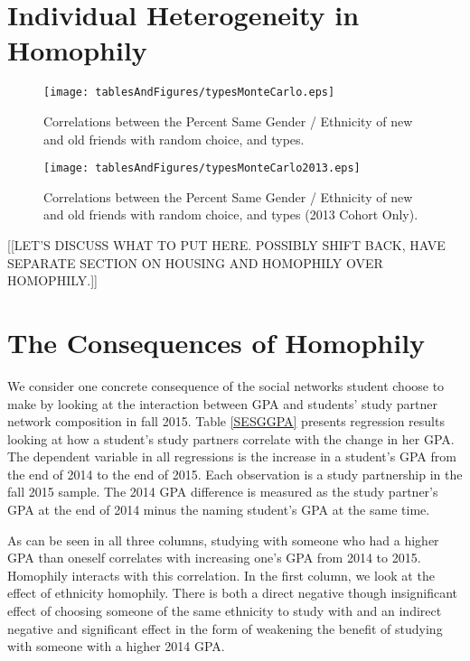 \documentclass[12pt,letterpaper,english]{article}
\begin{document}
\section{Individual Heterogeneity in Homophily \label{sec:heteroInHomophily} }

\begin{figure}[t!]
\begin{center}
\caption{Correlations between the Percent Same Gender / Ethnicity of new and old friends with random choice, and types.}
\texttt{[image: tablesAndFigures/typesMonteCarlo.eps]}
\end{center}
\end{figure}

\begin{figure}[t!]
\begin{center}
\caption{Correlations between the Percent Same Gender / Ethnicity of new and old friends with random choice, and types (2013 Cohort Only).}
\texttt{[image: tablesAndFigures/typesMonteCarlo2013.eps]}
\end{center}
\end{figure}

[[LET'S DISCUSS WHAT TO PUT HERE. POSSIBLY SHIFT BACK, HAVE SEPARATE SECTION ON HOUSING AND HOMOPHILY OVER HOMOPHILY.]]

\section{The Consequences of Homophily}
\label{sec:GPA}

We consider one concrete consequence of the social networks student choose to make by looking at the interaction between GPA and students' study partner network composition in fall 2015. Table \ref{SESGGPA} presents regression results looking at how a student's study partners correlate with the change in her GPA. The dependent variable in all regressions is the increase in a student's GPA from the end of 2014 to the end of 2015. Each observation is a study partnership in the fall 2015 sample. The 2014 GPA difference is measured as the study partner's GPA at the end of 2014 minus the naming student's GPA at the same time. 

As can be seen in all three columns, studying with someone who had a higher GPA than oneself correlates with increasing one's GPA from 2014 to 2015. Homophily interacts with this correlation. In the first column, we look at the effect of ethnicity homophily. There is both a direct negative though insignificant effect of choosing someone of the same ethnicity to study with and an indirect negative and significant effect in the form of weakening the benefit of studying with someone with a higher 2014 GPA.
\end{document}
